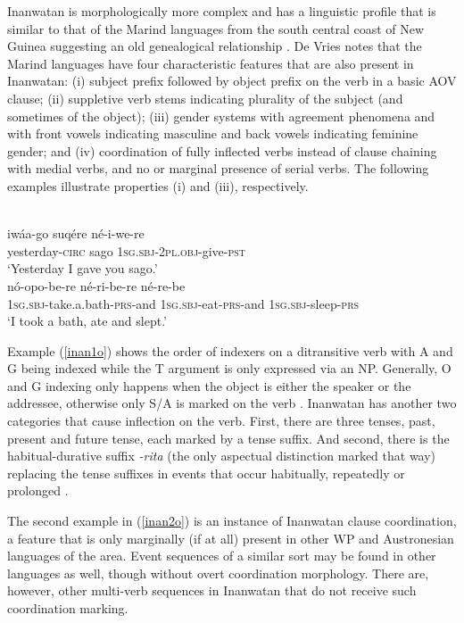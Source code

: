Inanwatan is morphologically more complex and has a linguistic profile that is similar to that of the Marind languages from the south central coast of New Guinea suggesting an old genealogical relationship \citep[16]{devries2004}. De Vries notes that the Marind languages have four characteristic features that are also present in Inanwatan: (i) subject prefix followed by object prefix on the verb in a basic AOV clause; (ii) suppletive verb stems indicating plurality of the subject (and sometimes of the object); (iii) gender systems with agreement phenomena and with front vowels indicating masculine and back vowels indicating feminine gender; and (iv) coordination of fully inflected verbs instead of clause chaining with medial verbs, and no or marginal presence of serial verbs. The following examples illustrate properties (i) and (iii), respectively.

\ea
{}\\
\ea \label{inan1o}
\gll iwáa-go suqére né-i-we-re \\
yesterday-\textsc{circ} sago \textsc{1}\textsc{sg}.\textsc{sbj}-\textsc{2}\textsc{pl}.\textsc{obj}-give-\textsc{pst} \\
\glft `Yesterday I gave you sago.' \\ 
\ex \label{inan2o}
\gll nó-opo-be-re né-ri-be-re né-re-be \\ 
\textsc{1}\textsc{sg}.\textsc{sbj}-take.a.bath-\textsc{prs}-and \textsc{1}\textsc{sg}.\textsc{sbj}-eat-\textsc{prs}-and \textsc{1}\textsc{sg}.\textsc{sbj}-sleep-\textsc{prs} \\
\glft `I took a bath, ate and slept.'
\z
\z

Example (\ref{inan1o}) shows the order of indexers on a ditransitive verb with A and G being indexed while the T argument is only expressed via an NP. Generally, O and G indexing only happens when the object is either the speaker or the addressee, otherwise only S/A is marked on the verb \citep[35]{devries2004}. Inanwatan has another two categories that cause inflection on the verb. First, there are three tenses, past, present and future tense, each marked by a tense suffix. And second, there is the habitual-durative suffix \textit{-rita} (the only aspectual distinction marked that way) replacing the tense suffixes in events that occur habitually, repeatedly or prolonged \citep[38]{devries2004}.

The second example in (\ref{inan2o}) is an instance of Inanwatan clause coordination, a feature that is only marginally (if at all) present in other WP and Austronesian languages of the area. Event sequences of a similar sort may be found in other languages as well, though without overt coordination morphology. There are, however, other multi-verb sequences in Inanwatan that do not receive such coordination marking.

